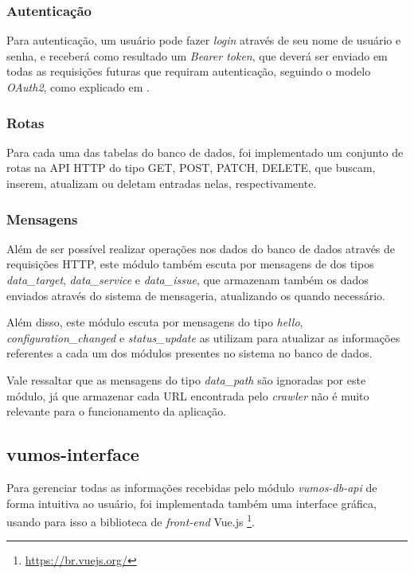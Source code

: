     \subsubsection{Autenticação}
    
    Para autenticação, um usuário pode fazer \textit{login} através de seu nome de usuário e senha, e receberá como resultado um \textit{Bearer token}, que deverá ser enviado em todas as requisições futuras que requiram autenticação, seguindo o modelo \textit{OAuth2}, como explicado em \cite{jones2012oauth}.
    
    \subsubsection{Rotas}
    
    Para cada uma das tabelas do banco de dados, foi implementado um conjunto de rotas na API HTTP do tipo GET, POST, PATCH, DELETE, que buscam, inserem, atualizam ou deletam entradas nelas, respectivamente.
    
    \subsubsection{Mensagens}
    
    Além de ser possível realizar operações nos dados do banco de dados através de requisições HTTP, este módulo também escuta por mensagens de dos tipos \textit{data\_target}, \textit{data\_service} e \textit{data\_issue}, que armazenam também os dados enviados através do sistema de mensageria, atualizando os quando necessário.
    
    Além disso, este módulo escuta por mensagens do tipo \textit{hello}, \textit{configuration\_changed} e \textit{status\_update} as utilizam para atualizar as informações referentes a cada um dos módulos presentes no sistema no banco de dados.
    
    Vale ressaltar que as mensagens do tipo \textit{data\_path} são ignoradas por este módulo, já que armazenar cada URL encontrada pelo \textit{crawler} não é muito relevante para o funcionamento da aplicação.
    

    \subsection{vumos-interface}
    
    Para gerenciar todas as informações recebidas pelo módulo \textit{vumos-db-api} de forma intuitiva ao usuário, foi implementada também uma interface gráfica, usando para isso a biblioteca de \textit{front-end} Vue.js \footnote{\url{https://br.vuejs.org/}}. 
    
